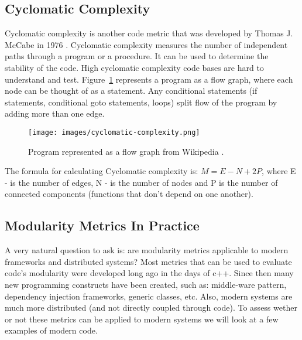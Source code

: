 \documentclass[12pt]{article}
\begin{document}
\subsection{Cyclomatic Complexity}
Cyclomatic complexity is another code metric that was developed by Thomas J. McCabe in 1976 \cite{Mcc76}. Cyclomatic complexity measures the number of independent paths through a program or a procedure. It can be used to determine the stability of the code. High cyclomatic complexity code bases are hard to understand and test. Figure~\ref{fig:cyclomatic-complexity} represents a program as a flow graph, where each node can be thought of as a statement. Any conditional statements (if statements, conditional goto statements, loops) split flow of the program by adding more than one edge.
\begin{figure}[H]
    \centering
    \texttt{[image: images/cyclomatic-complexity.png]}
    \caption{Program represented as a flow graph from Wikipedia \cite{Mcc76}.}
    \label{fig:cyclomatic-complexity}
\end{figure}
The formula for calculating Cyclomatic complexity is: $M = E - N + 2P$, where E - is the number of edges, N - is the number of nodes and P is the number of connected components (functions that don't depend on one another). 

\subsection{Modularity Metrics In Practice}
A very natural question to ask is: are modularity metrics applicable to modern frameworks and distributed systems? Most metrics that can be used to evaluate code's modularity were developed long ago in the days of c++. Since then many new programming constructs have been created, such as: middle-ware pattern, dependency injection frameworks, generic classes, etc. Also, modern systems are much more distributed (and not directly coupled through code). To assess wether or not these metrics can be applied to modern systems we will look at a few examples of modern code.
\end{document}

